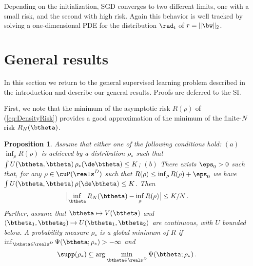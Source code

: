 \documentclass[11pt]{article}
\newtheorem{proposition}{Proposition}
\renewcommand{\eqref}[1]{(\ref{#1})}
\begin{document}
Depending on the initialization, SGD converges to two different limits, one with a small risk, and the second with high risk.
Again this behavior is well tracked by solving a one-dimensional PDE for the distribution $\rad_t$ of $r=\|\bw\|_2$.

\section{General results}
\label{sec:General}


In this section we return to the general supervised learning problem described in the introduction and describe our
general results. Proofs are deferred to the SI.

First, we note that the minimum of the asymptotic risk $R(\rho)$ of \eqref{eq:DensityRisk} provides a good approximation of 
the minimum of the finite-$N$ risk $R_{N}(\btheta)$. 
%
\begin{proposition}\label{thm:NtoInfty}
Assume that either one of the following conditions hold: $(a)$ $\inf_{\rho}R(\rho)$ is achieved by a distribution $\rho_*$ such that 
$\int U(\btheta, \btheta)\, \rho_*(\de\btheta)\le K$; $(b)$ There exists $\eps_0>0$ such that, for  any $\rho\in \cuP(\reals^D)$ such that 
$R(\rho)\le \inf_{\rho}R(\rho)+\eps_0$ we have  $\int U(\btheta, \btheta)\, \rho(\de\btheta)\le K$.
Then
%
\begin{align}
%
\big|\inf_{\btheta}R_{N}(\btheta)-\inf_{\rho}R(\rho)\big|\le K/N\, . \label{eq:SimpleBound}
%
\end{align}
%
Further, assume that $\btheta\mapsto V(\btheta)$ and $(\btheta_1,\btheta_2)\mapsto U(\btheta_1, \btheta_2)$ are continuous,
with $U$ bounded below.
A probability measure $\rho_*$ is a global minimum of $R$ if $\inf_{\btheta\in\reals^D}\Psi(\btheta;\rho_*)>-\infty$ and
%
\begin{align}
%
\supp(\rho_*)\subseteq \arg\min_{\btheta\in\reals^D}\Psi(\btheta;\rho_*)\, . \label{eq:GeneralMinCondition}
%
\end{align}
%
\end{proposition}
\end{document}
